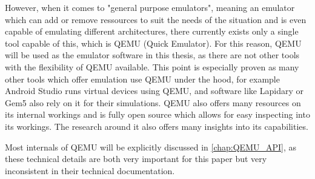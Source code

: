However, when it comes to "general purpose emulators",
meaning an emulator which can add or remove ressources to suit the needs of the situation
and is even capable of emulating different architectures,
there currently exists only a single tool capable of this,
which is QEMU (Quick Emulator).
For this reason, QEMU will be used as the emulator software in this thesis,
as there are not other tools with the flexibility of QEMU available.
This point is especially proven as many other tools which offer emulation
use QEMU under the hood, for example Android Studio runs virtual devices using QEMU,
and software like Lapidary\cite{lapidary} or Gem5\cite{gem5} also rely on it for their simulations.
QEMU also offers many resources on its internal workings and is fully open source
which allows for easy inspecting into its workings.
The research around it also offers many insights into its capabilities.

Most internals of QEMU will be explicitly discussed in \autoref{chap:QEMU_API},
as these technical details are both very important for this paper
but very inconsistent in their technical documentation.